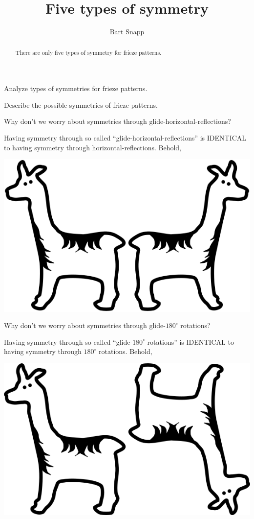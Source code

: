 \documentclass[noauthor,nooutcomes,hints,handout]{ximera}
\author{Bart Snapp}
\title{Five types of symmetry}
\begin{document}
\begin{abstract}
  There are only five types of symmetry for frieze patterns.
\end{abstract}
\maketitle

\begin{listOutcomes}
\item Analyze types of symmetries for frieze patterns.
\item Describe the possible symmetries of frieze patterns.
\end{listOutcomes}



\mynewpage


\begin{question}
  Why don't we worry about symmetries through
  glide-horizontal-reflections?
  \begin{freeResponse}
    Having symmetry through so called ``glide-horizontal-reflections''
    is IDENTICAL to having symmetry through
    horizontal-reflections. Behold,
    \begin{center}
      \includegraphics[width=.3\textwidth]{llamaGHF.png}
    \end{center}
  \end{freeResponse}
\end{question}
\mynewpage

\begin{question}
  Why don't we worry about symmetries through glide-$180^\circ$
  rotations?
  \begin{freeResponse}
    Having symmetry through so called ``glide-$180^\circ$ rotations''
    is IDENTICAL to having symmetry through
    $180^\circ$ rotations. Behold,
    \begin{center}
      \includegraphics[width=.3\textwidth]{llamaGR.png}
    \end{center}
  \end{freeResponse}
\end{question}
\mynewpage
\end{document}
